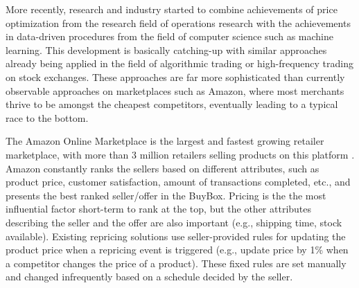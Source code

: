 More recently, research and industry started to combine
achievements of price optimization from the research field
of operations research with the achievements in data-driven
procedures from the field of computer science such as machine
learning. This development is basically catching-up
with similar approaches already being applied in the field
of algorithmic trading or high-frequency trading on stock
exchanges. These approaches are far more sophisticated than
currently observable approaches on marketplaces such as
Amazon, where most merchants thrive to be amongst the
cheapest competitors, eventually leading to a typical race to the
bottom. 

The Amazon Online Marketplace is the largest and fastest growing 
retailer marketplace, with more than 3 million retailers selling products on this platform \cite{}. 
Amazon constantly ranks the sellers based on different attributes, 
such as product price, customer satisfaction, amount of transactions completed, etc., and presents the best ranked seller/offer in the BuyBox. 
Pricing is the the most influential factor short-term to rank at the top, but the other attributes describing the seller and the offer are also important (e.g., shipping time, 
stock available).
Existing repricing solutions use seller-provided rules for updating the product price when a repricing event is triggered 
(e.g., update price by 1\% when a competitor changes the price of a product). 
These fixed rules are set manually and changed infrequently based on a schedule decided by the seller.

